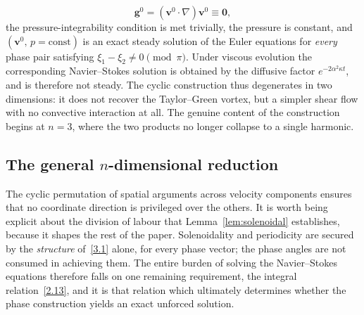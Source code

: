 \documentclass[11pt]{jfm}
\numberwithin{equation}{section}
\begin{document}
\begin{equation}
\label{3.8}
\boldsymbol{g}^0=(\boldsymbol{v}^0\!\cdot\!\nabla)\boldsymbol{v}^0\equiv\boldsymbol{0},
\end{equation}
the pressure-integrability condition is met trivially, the pressure is constant, and
$(\boldsymbol{v}^0,\,p=\mathrm{const})$ is an exact steady solution of the Euler equations for
\emph{every} phase pair satisfying $\xi_1-\xi_2\neq 0 \pmod{\pi}$. Under viscous evolution the
corresponding Navier--Stokes solution is obtained by the diffusive factor
$e^{-2\alpha^2\kappa t}$, and is therefore not steady. The cyclic construction thus
degenerates in two dimensions: it does not recover the Taylor--Green vortex, but a simpler shear
flow with no convective interaction at all. The genuine content of the construction begins at
$n=3$, where the two products no longer collapse to a single harmonic.

\subsection{The general $n$-dimensional reduction}
The cyclic permutation of spatial arguments across velocity components ensures that no coordinate direction is privileged over the others. It is worth being explicit about the division of labour that
Lemma~\ref{lem:solenoidal} establishes, because it shapes the rest of the paper. Solenoidality
and periodicity are secured by the \emph{structure} of~\eqref{3.1} alone, for every phase
vector; the phase angles are not consumed in achieving them. The entire burden of solving the
Navier--Stokes equations therefore falls on one remaining requirement, the integral
relation~\eqref{2.13}, and it is that relation which ultimately determines whether the phase
construction yields an exact unforced solution.
\end{document}
